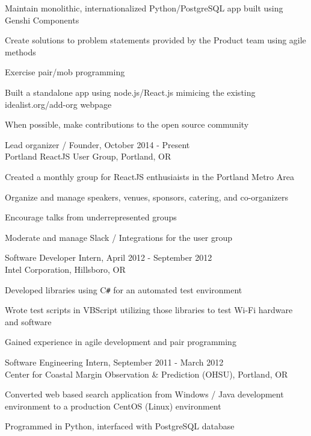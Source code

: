 \documentclass[10pt]{res} %
\newenvironment{packed_item}{
\begin{itemize}
  \setlength{\itemsep}{1pt}
  \setlength{\parskip}{0pt}
  \setlength{\parsep}{0pt}
}{\end{itemize}}
\begin{document}
\begin{resume}
\begin{packed_item}
	\item{Maintain monolithic, internationalized Python/PostgreSQL app built using \\Genshi Components}
	\item{Create solutions to problem statements provided by the Product team using agile methods}
	\item{Exercise pair/mob programming}
	\item{Built a standalone app using node.js/React.js mimicing the existing idealist.org/add-org webpage}
	\item{When possible, make contributions to the open source community}
\end{packed_item}

Lead organizer / Founder, October 2014 - Present\\
Portland ReactJS User Group, Portland, OR

\begin{packed_item}
    \item{Created a monthly group for ReactJS enthusiaists in the Portland Metro Area}
    \item{Organize and manage speakers, venues, sponsors, catering, and co-organizers}
    \item{Encourage talks from underrepresented groups}
    \item{Moderate and manage Slack / Integrations for the user group}
\end{packed_item}


Software Developer Intern, April 2012 - September 2012\\
Intel Corporation, Hillsboro, OR
\begin{packed_item}
	\item{Developed libraries using C\verb!#! for an automated test environment}
	\item{Wrote test scripts in VBScript utilizing those libraries to test Wi-Fi hardware and software}
	\item{Gained experience in agile development and pair programming}
\end{packed_item}

Software Engineering Intern, September 2011 - March 2012\\
Center for Coastal Margin Observation \& Prediction (OHSU), Portland, OR
\begin{packed_item}
	\item{Converted web based search application from Windows / Java development 
			environment to a production CentOS (Linux) environment}
	\item{Programmed in Python, interfaced with PostgreSQL database}
\end{packed_item}


\end{resume}
\end{document}
